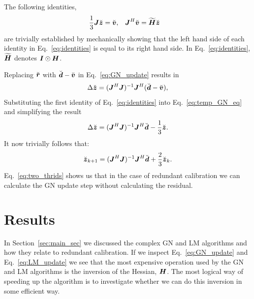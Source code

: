 \documentclass[useAMS,usenatbib]{mn2e}
\newcommand{\bz}{\bmath{z}}
\newcommand{\br}{\bmath{r}}
\newcommand{\bg}{\bmath{g}}
\newcommand{\bd}{\bmath{d}}
\newcommand{\bv}{\bmath{v}}
\newcommand{\bJ}{\bmath{J}}
\newcommand{\bH}{\bmath{H}}
\newcommand{\bI}{\bmath{I}}
\newcommand{\conj}[1]{\overline{#1}}
\begin{document}
The following identities,
\begin{align}
\label{eq:identities}
\frac{1}{3}\bJ\breve{\bz} &= \breve{\bv}, & \bJ^H\breve{\bv} &= \widetilde{\bH}\breve{\bz} 
\end{align}
are trivially established by mechanically showing that the left hand side of each identity in Eq.~\eqref{eq:identities} is equal to its right hand side.
In Eq.~\eqref{eq:identities}, $\widetilde{\bH}$ denotes $\bI\odot\bH$.

Replacing $\breve{\br}$ with $\breve{\bd}-\breve{\bv}$ in Eq.~\eqref{eq:GN_update} results in
\begin{equation}
\label{eq:temp_GN_eq}
\Delta \breve{\bz} = (\bJ^H\bJ)^{-1}\bJ^H(\breve{\bd}-\breve{\bv}), 
\end{equation}
Substituting the first identity of Eq.~\eqref{eq:identities} into Eq.~\eqref{eq:temp_GN_eq} and simplifying the result 
\begin{equation}
\label{eq:one_thrid}
\Delta \breve{\bz} = (\bJ^H\bJ)^{-1}\bJ^H\breve{\bd}-\frac{1}{3}\breve{\bz}.
\end{equation}
It now trivially follows that:
\begin{equation}
\label{eq:two_thrids}
\breve{\bz}_{k+1} = (\bJ^H\bJ)^{-1}\bJ^H\breve{\bd} + \frac{2}{3}\breve{\bz}_{k}. 
\end{equation}
Eq.~\eqref{eq:two_thrids} shows us that in the case of redundant calibration we can calculate the GN update step without calculating the residual. 
% 

\section{Results}
\label{sec:results}
In Section~\ref{sec:main_sec} we discussed the complex GN and LM algorithms and how they relate to redundant calibration. If we inspect Eq.~\eqref{eq:GN_update} and 
Eq.~\eqref{eq:LM_update} we see that the most expensive operation used by the GN and LM algorithms is the inversion of the Hessian, $\bH$. The most logical 
way of speeding up the algorithm is to investigate whether we can do this inversion in some efficient way.
\end{document}
